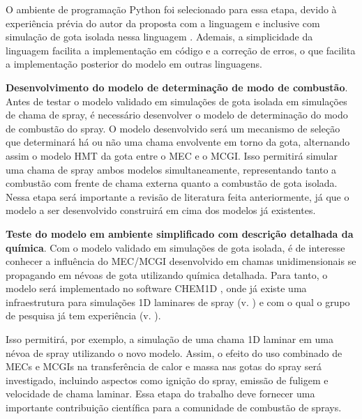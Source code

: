 O ambiente de programação Python foi selecionado para essa etapa, devido à experiência prévia do autor da proposta com a linguagem e inclusive com simulação de gota isolada nessa linguagem \cite{HenningsJ2024MT}.
Ademais, a simplicidade da linguagem facilita a implementação em código e a correção de erros, o que facilita a implementação posterior do modelo em outras linguagens.

\textbf{Desenvolvimento do modelo de determinação de modo de combustão}.
Antes de testar o modelo validado em simulações de gota isolada em simulações de chama de spray, é necessário desenvolver o modelo de determinação do modo de combustão do spray.
O modelo desenvolvido será um mecanismo de seleção que determinará há ou não uma chama envolvente em torno da gota, alternando assim o modelo HMT da gota entre o MEC e o MCGI.
Isso permitirá simular uma chama de spray ambos modelos simultaneamente, representando tanto a combustão com frente de chama externa quanto a combustão de gota isolada.
Nessa etapa será importante a revisão de literatura feita anteriormente, já que o modelo a ser desenvolvido construirá em cima dos modelos já existentes.


\textbf{Teste do modelo em ambiente simplificado com descrição detalhada da química}.
Com o modelo validado em simulações de gota isolada, é de interesse conhecer a influência do MEC/MCGI desenvolvido em chamas unidimensionais se propagando em névoas de gota utilizando química detalhada.
Para tanto, o modelo será implementado no software CHEM1D \cite{Sommers1994PhD}, onde já existe uma infraestrutura para simulações 1D laminares de spray (v. \cite{Sommers1994PhD,vanOijen2002CTM,vanOijen2016PECS, SacomanoF2018CTM,SacomanoF2021Fluids}) e com o qual o grupo de pesquisa já tem experiência (v. \cite{SacomanoF2018CTM,SacomanoF2019IJHMT,SacomanoF2021Fluids,SacomanoF2024CF,SacomanoF2025CF}).

Isso permitirá, por exemplo, a simulação de uma chama 1D laminar em uma névoa de spray utilizando o novo modelo.
Assim, o efeito do uso combinado de MECs e MCGIs na transferência de calor e massa nas gotas do spray será investigado, incluindo aspectos como ignição do spray, emissão de fuligem e velocidade de chama laminar.
Essa etapa do trabalho deve fornecer uma importante contribuição científica para a comunidade de combustão de sprays.

